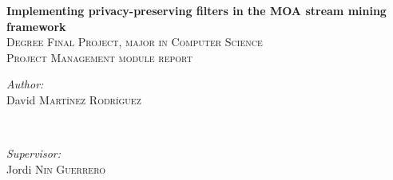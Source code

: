 \begin{titlepage}

\newcommand{\HRule}{\rule{\linewidth}{0.5mm}} %

\center %
 


\vspace*{4cm}

{ \huge \bfseries Implementing privacy-preserving filters in the MOA stream mining framework}\\[1cm] %

\textsc{\Large Degree Final Project, major in Computer Science}\\[0.5cm] %
\textsc{\large Project Management module report}\\[3.5cm] %

 

\begin{minipage}{0.4\textwidth}
\begin{flushleft} \large
\emph{Author:}\\
David \textsc{Martínez Rodríguez} %
\end{flushleft}
\end{minipage}
~
\begin{minipage}{0.4\textwidth}
\begin{flushright} \large
\emph{Supervisor:} \\
Jordi \textsc{Nin Guerrero} %
\end{flushright}
\end{minipage}\\[5.5cm]


\end{titlepage}
